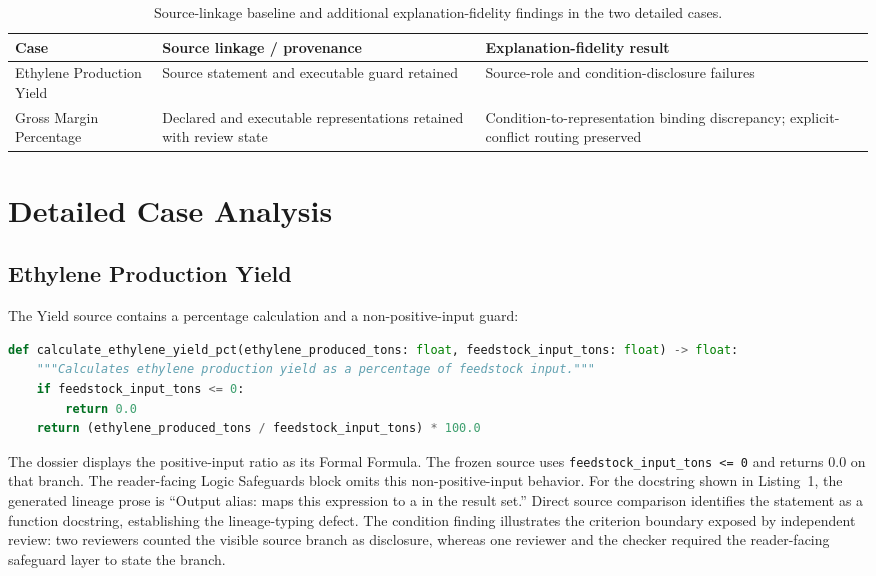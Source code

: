\documentclass[a4paper,fleqn]{cas-dc}
\begin{document}
\begin{table}[t]
\centering
\caption{Source-linkage baseline and additional explanation-fidelity findings in the two detailed cases.}
\label{tab:baseline}
\begin{tabularx}{\columnwidth}{@{}lYY@{}}
\toprule
Case & Source linkage / provenance & Explanation-fidelity result \\
\midrule
Ethylene Production Yield & Source statement and executable guard retained & Source-role and condition-disclosure failures \\
Gross Margin Percentage & Declared and executable representations retained with review state & Condition-to-representation binding discrepancy; explicit-conflict routing preserved \\
\bottomrule
\end{tabularx}
\end{table}
\FloatBarrier
\section{Detailed Case Analysis}
\subsection{Ethylene Production Yield}
The Yield source contains a percentage calculation and a non-positive-input guard:
\begin{lstlisting}[language=Python,breaklines=true,breakatwhitespace=true,caption={Verbatim Yield source excerpt from the frozen dossier source; SHA-256 identity is retained in the supplement.}]
def calculate_ethylene_yield_pct(ethylene_produced_tons: float, feedstock_input_tons: float) -> float:
    """Calculates ethylene production yield as a percentage of feedstock input."""
    if feedstock_input_tons <= 0:
        return 0.0
    return (ethylene_produced_tons / feedstock_input_tons) * 100.0
\end{lstlisting}
The dossier displays the positive-input ratio as its Formal Formula. The frozen source uses \texttt{feedstock\_input\_tons <= 0} and returns 0.0 on that branch. The reader-facing Logic Safeguards block omits this non-positive-input behavior. For the docstring shown in Listing~1, the generated lineage prose is ``Output alias: maps this expression to a in the result set.'' Direct source comparison identifies the statement as a function docstring, establishing the lineage-typing defect. The condition finding illustrates the criterion boundary exposed by independent review: two reviewers counted the visible source branch as disclosure, whereas one reviewer and the checker required the reader-facing safeguard layer to state the branch.
\end{document}
